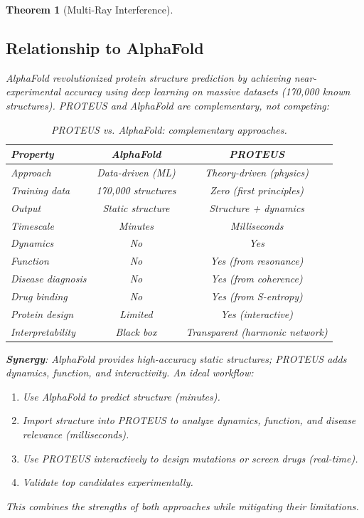 \documentclass[11pt,a4paper]{article}
\newtheorem{theorem}{Theorem}[section]
\begin{document}
\begin{theorem}[Multi-Ray Interference]
\subsection{Relationship to AlphaFold}

AlphaFold \cite{Jumper2021} revolutionized protein structure prediction by achieving near-experimental accuracy using deep learning on massive datasets (170,000 known structures). PROTEUS and AlphaFold are complementary, not competing:

\begin{table}[H]
\centering
\caption{PROTEUS vs. AlphaFold: complementary approaches.}
\begin{tabular}{lcc}
\hline
\textbf{Property} & \textbf{AlphaFold} & \textbf{PROTEUS} \\
\hline
Approach & Data-driven (ML) & Theory-driven (physics) \\
Training data & 170,000 structures & Zero (first principles) \\
Output & Static structure & Structure + dynamics \\
Timescale & Minutes & Milliseconds \\
Dynamics & No & Yes \\
Function & No & Yes (from resonance) \\
Disease diagnosis & No & Yes (from coherence) \\
Drug binding & No & Yes (from S-entropy) \\
Protein design & Limited & Yes (interactive) \\
Interpretability & Black box & Transparent (harmonic network) \\
\hline
\end{tabular}
\end{table}

\textbf{Synergy}: AlphaFold provides high-accuracy static structures; PROTEUS adds dynamics, function, and interactivity. An ideal workflow:
\begin{enumerate}
\item Use AlphaFold to predict structure (minutes).
\item Import structure into PROTEUS to analyze dynamics, function, and disease relevance (milliseconds).
\item Use PROTEUS interactively to design mutations or screen drugs (real-time).
\item Validate top candidates experimentally.
\end{enumerate}

This combines the strengths of both approaches while mitigating their limitations.


\end{theorem}
\end{document}
